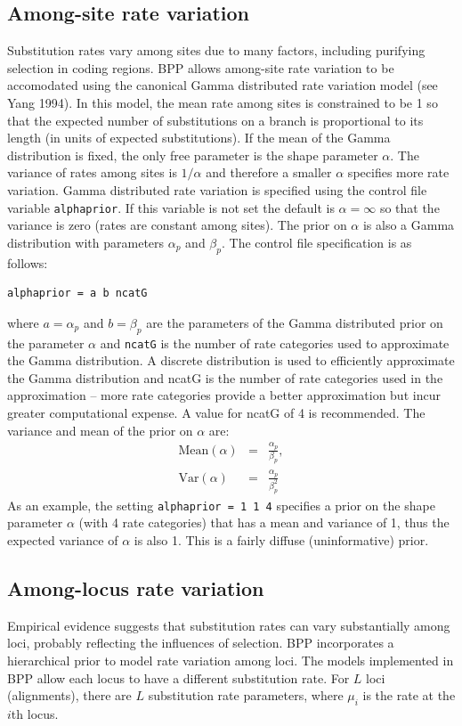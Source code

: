 \documentclass{book}
\numberwithin{equation}{section} \renewcommand{\baselinestretch}{0.55}
\begin{document}
\subsection{Among-site rate variation}
Substitution rates vary among sites due to many factors, including
purifying selection in coding regions.  BPP allows among-site rate
variation to be accomodated using the canonical Gamma distributed rate
variation model (see Yang 1994). In this model, the mean rate among
sites is constrained to be 1 so that the expected number of
substitutions on a branch is proportional to its length (in units of
expected substitutions). If the mean of the Gamma distribution is
fixed, the only free parameter is the shape parameter $\alpha$. The
variance of rates among sites is $1/\alpha$ and therefore a smaller
$\alpha$ specifies more rate variation.  Gamma distributed rate
variation is specified using the control file variable
\texttt{alphaprior}. If this variable is not set the default is
$\alpha = \infty$ so that the variance is zero (rates are constant
among sites).  The prior on $\alpha$ is also a Gamma distribution with
parameters $\alpha_p$ and $\beta_p$.  The control file specification
is as follows:
\begin{verbatim}
alphaprior = a b ncatG
\end{verbatim}
where $a = \alpha_p$ and $b = \beta_p$ are the parameters of the Gamma
distributed prior on the parameter $\alpha$ and \texttt{ncatG} is the
number of rate categories used to approximate the Gamma distribution.
A discrete distribution is used to efficiently approximate the Gamma
distribution and ncatG is the number of rate categories used in the
approximation -- more rate categories provide a better approximation
but incur greater computational expense. A value for ncatG of 4 is
recommended.  The variance and mean of the prior on $\alpha$ are:
\begin{eqnarray}
  \textrm{Mean}(\alpha) & = & \frac{\alpha_p}{\beta_p}, \nonumber \\
  \textrm{Var}(\alpha) & = & \frac{\alpha_p}{\beta_p^2} \nonumber
\end{eqnarray}
As an example, the setting \texttt{alphaprior = 1 1 4} specifies a
prior on the shape parameter $\alpha$ (with 4 rate categories) that
has a mean and variance of 1, thus the expected variance of $\alpha$
is also 1. This is a fairly diffuse (uninformative) prior.

\subsection{Among-locus rate variation}
Empirical evidence suggests that substitution rates can vary
substantially among loci, probably reflecting the influences of
selection. BPP incorporates a hierarchical prior to model rate
variation among loci.  The models implemented in BPP allow each locus
to have a different substitution rate.  For $L$ loci (alignments),
there are $L$ substitution rate parameters, where $\mu_i$ is the rate
at the $i$th locus.
\end{document}
